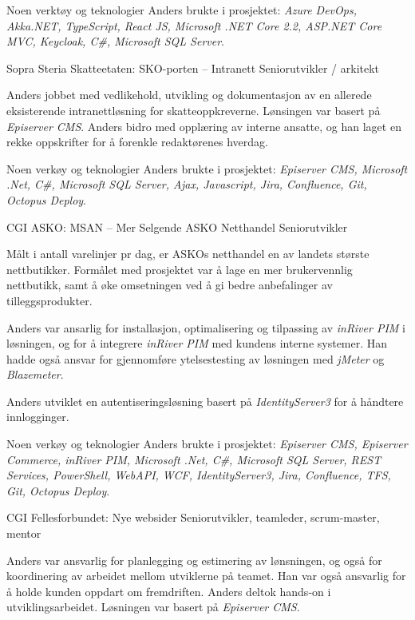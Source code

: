 \documentclass[10pt]{article} %
\begin{document}
\begin{paracol}{2}
{\qquad Noen verktøy og teknologier Anders brukte i prosjektet: \textit{Azure DevOps, Akka.NET, TypeScript, React JS, Microsoft .NET Core 2.2, ASP.NET Core MVC, Keycloak, C\#, Microsoft SQL Server}.} 


{Sopra Steria} %
{Skatteetaten: SKO-porten -- Intranett} 
{Seniorutvikler / arkitekt} 
{Anders jobbet med vedlikehold, utvikling og dokumentasjon av en allerede eksisterende intranettløsning for skatteoppkreverne. Lønsingen var basert på \textit{Episerver CMS}. Anders bidro med opplæring av interne ansatte, og han laget en rekke oppskrifter for å forenkle redaktørenes hverdag.

\qquad Noen verkøy og teknologier Anders brukte i prosjektet: \textit{Episerver CMS, Microsoft .Net, C\#, Microsoft SQL Server, Ajax, Javascript, Jira, Confluence, Git, Octopus Deploy}.} 

{CGI} %
{ASKO: MSAN -- Mer Selgende ASKO Netthandel} 
{Seniorutvikler} 
{Målt i antall varelinjer pr dag, er ASKOs netthandel en av landets største nettbutikker. Formålet med prosjektet var å lage en mer brukervennlig nettbutikk, samt å øke omsetningen ved å gi bedre anbefalinger av tilleggsprodukter.

\qquad Anders var ansarlig for installasjon, optimalisering og tilpassing av \textit{inRiver PIM} i løsningen, og for å integrere 
\textit{inRiver PIM} med kundens interne systemer. Han hadde også ansvar for gjennomføre ytelsestesting av løsningen 
med \textit{jMeter} og  \textit{Blazemeter}.

\qquad Anders utviklet en autentiseringsløsning basert på \textit{IdentityServer3}
for å håndtere innlogginger.

\qquad Noen verkøy og teknologier Anders brukte i prosjektet: \textit{Episerver CMS, Episerver Commerce, inRiver PIM, Microsoft .Net, C\#, Microsoft SQL Server, REST Services, PowerShell, WebAPI, WCF, IdentityServer3, Jira, Confluence, TFS, Git, Octopus Deploy}.} 
\pagebreak


{CGI} 
{Fellesforbundet: Nye websider} 
{Seniorutvikler, teamleder, scrum-master, mentor} 
{Anders var ansvarlig for planlegging og estimering av lønsningen, og også for koordinering av arbeidet mellom utviklerne på teamet. 
Han var også ansvarlig for å holde kunden oppdart om fremdriften. Anders deltok hands-on i utviklingsarbeidet. Løsningen var basert
på \textit{Episerver CMS}.

}
\end{paracol}
\end{document}
